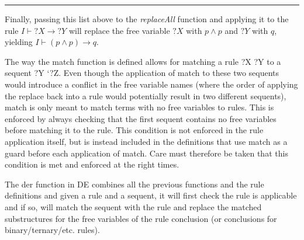 \begin{center}\rule{3in}{0.4pt}\end{center}

Finally, passing this list above to the \emph{replaceAll} function and
applying it to the rule $I \vdash ?X
\rightarrow ?Y$ will replace the free variable $?X$
with $p \land p$ and $?Y$ with $q$, yielding $I
\vdash (p \land p)
\rightarrow q$.

The way the match function is defined allows for matching a rule ?X ?Y
to a sequent ?Y `?Z. Even though the application of match to these two
sequents would introduce a conflict in the free variable names (where
the order of applying the replace back into a rule would potentially
result in two different sequents), match is only meant to match terms
with no free variables to rules. This is enforced by always checking
that the first sequent contains no free variables before matching it to
the rule. This condition is not enforced in the rule application itself,
but is instead included in the definitions that use match as a guard
before each application of match. Care must therefore be taken that this
condition is met and enforced at the right times.

The der function in DE combines all the previous functions and the rule
definitions and given a rule and a sequent, it will first check the rule
is applicable and if so, will match the sequent with the rule and
replace the matched substructures for the free variables of the rule
conclusion (or conclusions for binary/ternary/etc. rules).
